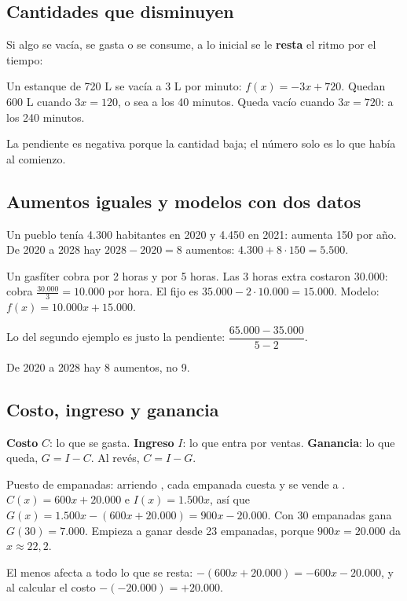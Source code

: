 \subsection{Cantidades que disminuyen}
Si algo se vacía, se gasta o se consume, a lo inicial se le \textbf{resta} el ritmo por el tiempo:
\begin{ejemplo} Un estanque de 720 L se vacía a 3 L por minuto: $f(x) = -3x + 720$. Quedan 600 L cuando $3x = 120$, o sea a los 40 minutos. Queda vacío cuando $3x = 720$: a los 240 minutos.\end{ejemplo}
La pendiente es negativa porque la cantidad baja; el número solo es lo que había al comienzo.

\subsection{Aumentos iguales y modelos con dos datos}
\begin{ejemplo} Un pueblo tenía 4.300 habitantes en 2020 y 4.450 en 2021: aumenta 150 por año. De 2020 a 2028 hay $2028 - 2020 = 8$ aumentos: $4.300 + 8\cdot 150 = 5.500$.\end{ejemplo}
\begin{ejemplo} Un gasfíter cobra  por 2 horas y  por 5 horas. Las 3 horas extra costaron 30.000: cobra $\frac{30.000}{3} = 10.000$ por hora. El fijo es $35.000 - 2\cdot 10.000 = 15.000$. Modelo: $f(x) = 10.000x + 15.000$.\end{ejemplo}
Lo del segundo ejemplo es justo la pendiente: $\dfrac{65.000 - 35.000}{5 - 2}$.
\begin{ojo} De 2020 a 2028 hay 8 aumentos, no 9.\end{ojo}

\subsection{Costo, ingreso y ganancia}
\begin{clave} \textbf{Costo} $C$: lo que se gasta. \textbf{Ingreso} $I$: lo que entra por ventas. \textbf{Ganancia}: lo que queda, $G = I - C$. Al revés, $C = I - G$.\end{clave}
\begin{ejemplo} Puesto de empanadas: arriendo , cada empanada cuesta  y se vende a . $C(x) = 600x + 20.000$ e $I(x) = 1.500x$, así que
$G(x) = 1.500x - (600x + 20.000) = 900x - 20.000$. Con 30 empanadas gana $G(30) = 7.000$. Empieza a ganar desde 23 empanadas, porque $900x = 20.000$ da $x \approx 22{,}2$.\end{ejemplo}
\begin{ojo}[El paréntesis] El menos afecta a todo lo que se resta: $-(600x + 20.000) = -600x - 20.000$, y al calcular el costo $-(-20.000) = +20.000$.\end{ojo}

